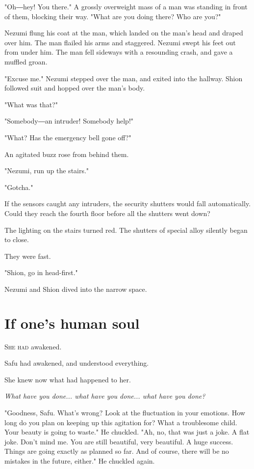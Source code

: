 "Oh―hey! You there." A grossly overweight mass of a man was standing in
front of them, blocking their way. "What are you doing there? Who are
you?"

Nezumi flung his coat at the man, which landed on the man's head and
draped over him. The man flailed his arms and staggered. Nezumi swept
his feet out from under him. The man fell sideways with a resounding
crash, and gave a muffled groan.

"Excuse me." Nezumi stepped over the man, and exited into the hallway.
Shion followed suit and hopped over the man's body.

"What was that?"

"Somebody―an intruder! Somebody help!"

"What? Has the emergency bell gone off?"

An agitated buzz rose from behind them.

"Nezumi, run up the stairs."

"Gotcha."

If the sensors caught any intruders, the security shutters would fall
automatically. Could they reach the fourth floor before all the shutters
went down?

The lighting on the stairs turned red. The shutters of special alloy
silently began to close.

They were fast.

"Shion, go in head-first."

Nezumi and Shion dived into the narrow space.

\chapter{If one's human soul}


\lettrine{S}{he had} awakened.

Safu had awakened, and understood everything.

She knew now what had happened to her.

\emph{What have you done... what have you done... what have you done?}

"Goodness, Safu. What's wrong? Look at the fluctuation in your emotions.
How long do you plan on keeping up this agitation for? What a
troublesome child. Your beauty is going to waste." He chuckled. "Ah, no,
that was just a joke. A flat joke. Don't mind me. You are still
beautiful, very beautiful. A huge success. Things are going exactly as
planned so far. And of course, there will be no mistakes in the future,
either." He chuckled again.

